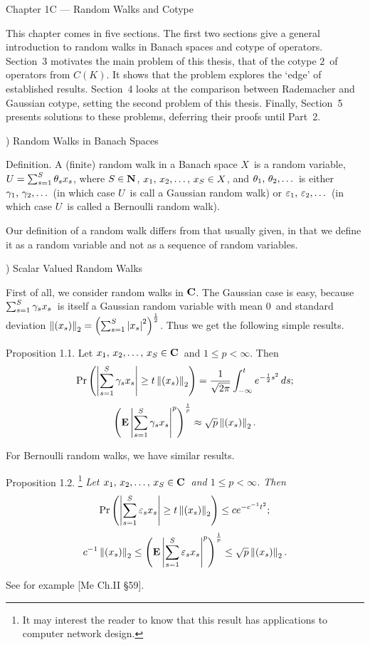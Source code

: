 \vfill
\eject
 
\beginsection Chapter 1C --- Random Walks and Cotype
 
This chapter comes in five sections. The first two sections give
a general
introduction to random walks in Banach spaces and cotype of operators.
Section~3 motivates the main problem of this thesis, that of the
cotype $2$\ of
operators from $C(K)$. It shows that the problem explores
the `edge' of established results. Section~4 looks at the comparison
between
Rademacher and Gaussian cotype, setting the second problem of this
thesis.
Finally, Section~5 presents solutions to these problems, deferring
their proofs
until Part~2.
 
) Random Walks in Banach Spaces
 
\proclaim Definition. A {\dt (finite) random walk} in a Banach space
$X$\ is a
random variable, $U=\sum_{s=1}^S \theta_s x_s$, where $S\in{\bf N}$, $\xS\in X$, and $\thetalist$\
is either $\gammalist$\ (in which case $U$\ is call a {\dt Gaussian
random walk})
or $\epsilonlist$\ (in which case $U$\ is called a {\dt Bernoulli
random
walk}).
 
Our definition of a random walk differs from that usually given,
in that we
define it as a random variable and not as a sequence of random variables.
 
) Scalar Valued Random Walks
 
First of all, we consider random walks in ${\bf C}$. The Gaussian case
is easy,
because $\sum_{s=1}^S \gamma_s x_s$\ is itself a Gaussian random variable with mean
$0$\ and
standard deviation $\left\| (x_s) \right\|_2 = \left(\sum_{s=1}^S \left| x_s\right|^2\right)^{1\over2}$. Thus we get the following
simple results.
 
\proclaim Proposition 1.1. Let $\xS\in\C$\ and $1\le p<\infty$. Then
\cditem{i)}
$$ \mathop{\rm Pr}\nolimits \left( \left|\sum_{s=1}^S \gamma_s x_s\right| \ge t \left\| (x_s) \right\|_2 \right) = {1\over\sqrt{2\pi}}
   \int_{-\infty}^t e^{-{1\over2} s^2} \,ds ;$$
$$ \left({\bf E}\left|\sum_{s=1}^S \gamma_s x_s\right|^p\right)^{1\over p} \approx \sqrt p \left\| (x_s) \right\|_2
.$$
 
For Bernoulli random walks, we have similar results.
 
\proclaim Proposition 1.2. \rm\footnote*{\sevenrm It may interest
the reader to
know that this result has applications to computer network design.}\sl
Let $\xS\in\C$\ and $1\le p<\infty$. Then
$$ \mathop{\rm Pr}\nolimits \left( \left|\sum_{s=1}^S \varepsilon_s x_s\right| \ge t \left\| (x_s) \right\|_2 \right) \le c e^{-c^{-1}
t^2} ;$$
$$ c^{-1} \left\| (x_s) \right\|_2 \le \left({\bf E}\left|\sum_{s=1}^S \varepsilon_s x_s\right|^p\right)^{1\over p}
   \le \sqrt p \left\| (x_s) \right\|_2 .$$
 
\Proof See for example [Me Ch.II \S59].
\endproof
 
